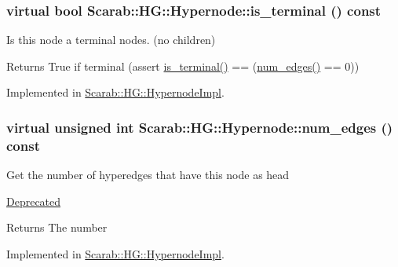 \hypertarget{classScarab_1_1HG_1_1Hypernode_ae3e1107309a8817d1015bd70a90c1c49}{
\subsubsection[{is\_\-terminal}]{\setlength{\rightskip}{0pt plus 5cm}virtual bool Scarab::HG::Hypernode::is\_\-terminal () const}}
\label{classScarab_1_1HG_1_1Hypernode_ae3e1107309a8817d1015bd70a90c1c49}
Is this node a terminal nodes. (no children)

\begin{DoxyReturn}{Returns}
True if terminal (assert \hyperlink{classScarab_1_1HG_1_1Hypernode_ae3e1107309a8817d1015bd70a90c1c49}{is\_\-terminal()} == (\hyperlink{classScarab_1_1HG_1_1Hypernode_add2f4d556be223b906bfbab9f1b60870}{num\_\-edges()} == 0)) 
\end{DoxyReturn}


Implemented in \hyperlink{classScarab_1_1HG_1_1HypernodeImpl_a2bb4b33ff207c3c1babe135b9af6323e}{Scarab::HG::HypernodeImpl}.

\hypertarget{classScarab_1_1HG_1_1Hypernode_add2f4d556be223b906bfbab9f1b60870}{
\subsubsection[{num\_\-edges}]{\setlength{\rightskip}{0pt plus 5cm}virtual unsigned int Scarab::HG::Hypernode::num\_\-edges () const}}
\label{classScarab_1_1HG_1_1Hypernode_add2f4d556be223b906bfbab9f1b60870}
Get the number of hyperedges that have this node as head \begin{Desc}
\item[\hyperlink{deprecated__deprecated000007}{Deprecated}]\end{Desc}
\begin{DoxyReturn}{Returns}
The number 
\end{DoxyReturn}


Implemented in \hyperlink{classScarab_1_1HG_1_1HypernodeImpl_a7fed4809706319cc916ed4c04a641436}{Scarab::HG::HypernodeImpl}.

